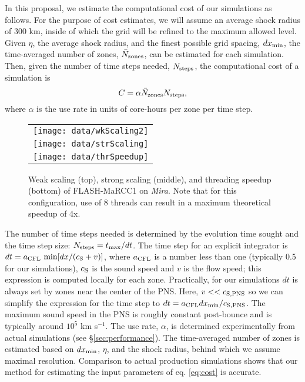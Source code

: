 In this proposal, we estimate the computational cost of our
simulations as follows.  For the purpose of cost estimates, we will
assume an average shock radius of 300 km, inside of which the grid
will be refined to the maximum allowed level.   Given $\eta$, the
average shock radius, and the finest possible grid spacing, $d
x_{\rm min}$, the time-averaged number of zones, $\bar N_{\rm zones}$,
can be estimated for each simulation.  Then, given the number of time
steps needed, $N_{\rm steps}$, the computational cost of a simulation
is 
\begin{equation}
C = \alpha   \bar N_{\rm zones} N_{\rm steps},
\label{eq:cost}
\end{equation}
where $\alpha$ is the use rate in units of core-hours per zone per
time step. 
\begin{wrapfigure}[41]{r}{3.5in}
\begin{tabular}{c}
\texttt{[image: data/wkScaling2]} \\
\texttt{[image: data/strScaling]} \\
\texttt{[image: data/thrSpeedup]}
\end{tabular}
\caption{Weak scaling (top), strong scaling (middle), and threading
  speedup (bottom) of FLASH-MaRCC1 on {\it Mira}.  Note that for this configuration, use of 8 threads can result in a maximum theoretical speedup of 4x.}
\label{fig:scaling}
\end{wrapfigure}  
The number of time steps needed is determined by the
evolution time sought and the time step size: $N_{\rm steps} = t_{\rm
  max} / d t$. 
The time step for an explicit integrator is $d t = a_{\rm CFL}\ {\rm min}[d x / (c_{\rm S} + v)]$, where $a_{\rm CFL}$ is a number less than one (typically 0.5 for our simulations), $c_{\rm S}$ is the sound speed and $v$ is the flow speed; this expression is computed locally for each zone.  
Practically, for our simulations $d t$ is always set by zones near the center of the PNS.  Here, $v << c_{\rm S,PNS}$ so we can simplify the expression for the time step to $d t = a_{\rm CFL} d x_{\rm
  min} / c_{\rm S,PNS}$. The maximum sound speed in the PNS is roughly
constant post-bounce and is typically around $10^5$ km s$^{-1}$. 
The use rate, $\alpha$, is determined experimentally from actual simulations (see \S\ref{sec:performance}).  The time-averaged number of zones is estimated based on $d x_{\rm min}$, $\eta$, and the shock radius, behind which we assume maximal resolution.  Comparison to actual production simulations shows that our method for estimating the input parameters of eq. \ref{eq:cost} is accurate.


